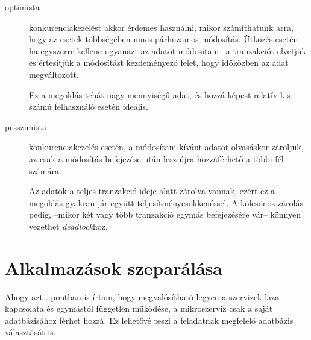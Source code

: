\begin{description}
	\item[optimista] konkurenciakezelést akkor érdemes használni, mikor számíthatunk arra, hogy az esetek többségében nincs párhuzamos módosítás. Ütközés esetén --ha egyszerre kellene ugyanazt az adatot módosítani-- a tranzakciót elvetjük és értesítjük a módosítást kezdeményező felet, hogy időközben  az adat megváltozott.
	
	Ez a megoldás tehát nagy mennyiségű adat, és hozzá képest relatív kis számú felhasználó esetén ideális.
	
	\item[pesszimista] konkurenciakezelés esetén, a módosítani kívánt adatot olvasáskor zároljuk, az csak a módosítás befejezése után lesz újra hozzáférhető a többi fél számára.
	
	Az adatok a teljes tranzakció ideje alatt zárolva vannak, ezért ez a megoldás gyakran jár együtt teljesítménycsökkenéssel. A kölcsönös zárolás pedig, --mikor két vagy több tranzakció egymás befejezésére vár-- könnyen vezethet \textit{deadlock}hoz.
\end{description}


\section{Alkalmazások szeparálása}\label{sec:alkalmazasok_szeparalasa}
Ahogy azt . pontban is írtam, hogy megvalósítható legyen a szervizek laza kapcsolata és egymástól független működése, a mikroszerviz csak a saját adatbázisához férhet hozzá. Ez lehetővé teszi a feladatnak megfelelő adatbázis választását is.

